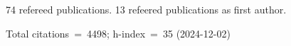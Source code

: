 74 refereed publications. 13 refeered publications as first author.

Total citations~=~4498; h-index~=~35 (2024-12-02)